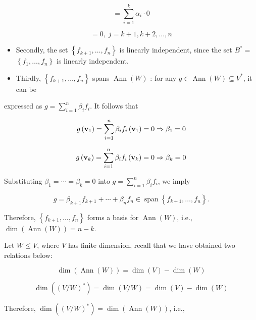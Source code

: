 \documentclass[11pt]{article}
\begin{document}
\[
= \mathop{\sum }\limits_{{i = 1}}^{k}\alpha_{i} \cdot  0
\]

\[
= 0,\;j = k + 1,k + 2,\ldots ,n
\]

\begin{itemize}
\item Secondly, the set \(\left\{  {{f}_{k + 1},\ldots ,{f}_n}\right\}\) is linearly independent, since the set \({B}^{ * } =\)  \(\left\{  {{f}_1,\ldots ,{f}_n}\right\}\) is linearly independent.
\end{itemize}

\begin{itemize}
\item Thirdly, \(\left\{  {{f}_{k + 1},\ldots ,{f}_n}\right\}\) spans \(\operatorname{Ann}\left( W\right)\) : for any \(g \in  \operatorname{Ann}\left( W\right)  \subseteq  {V}^{ * }\), it can be
\end{itemize}

expressed as \(g = \mathop{\sum }\limits_{{i = 1}}^n\beta_{i}{f}_{i}\). It follows that

\[
g\left( {\bf v}_1\right)  = \mathop{\sum }\limits_{{i = 1}}^n\beta_{i}{f}_{i}\left( {\bf v}_1\right)  = 0 \Rightarrow  \beta_1 = 0
\]

\[
g\left( {\bf v}_{k}\right)  = \mathop{\sum }\limits_{{i = 1}}^n\beta_{i}{f}_{i}\left( {\bf v}_{k}\right)  = 0 \Rightarrow  \beta_{k} = 0
\]

Substituting \(\beta_1 = \cdots  = \beta_{k} = 0\) into \(g = \mathop{\sum }\limits_{{i = 1}}^n\beta_{i}{f}_{i}\), we imply

\[
g = \beta_{k + 1}{f}_{k + 1} + \cdots  + \beta_n{f}_n \in  \operatorname{span}\left\{  {{f}_{k + 1},\ldots ,{f}_n}\right\}  .
\]

Therefore, \(\left\{  {{f}_{k + 1},\ldots ,{f}_n}\right\}\) forms a basis for \(\operatorname{Ann}\left( W\right)\), i.e., \(\dim \left( {\operatorname{Ann}\left( W\right) }\right)  = n - k\).

Let \(W \leq  V\), where \(V\) has finite dimension, recall that we have obtained two relations below:

\[
\dim \left( {\operatorname{Ann}\left( W\right) }\right)  = \dim \left( V\right)  - \dim \left( W\right)
\]

\[
\dim \left( {\left( V/W\right) }^{ * }\right)  = \dim \left( {V/W}\right)  = \dim \left( V\right)  - \dim \left( W\right)
\]

Therefore, \(\dim \left( {\left( V/W\right) }^{ * }\right)  = \dim \left( {\operatorname{Ann}\left( W\right) }\right)\), i.e.,
\end{document}
